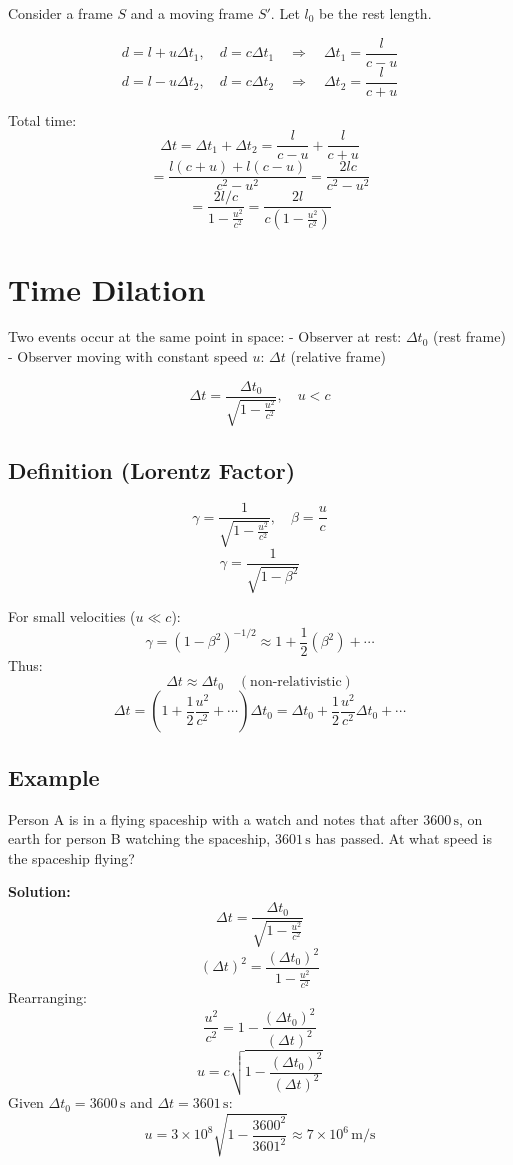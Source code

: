 \documentclass[a4paper,12pt]{article}
\begin{document}
\begin{multicols}{2}
Consider a frame \( S \) and a moving frame \( S' \). Let \( l_0 \) be the rest length.

\[
d = l + u \Delta t_1, \quad d = c \Delta t_1 \quad \Rightarrow \quad \Delta t_1 = \frac{l}{c - u}
\]
\[
d = l - u \Delta t_2, \quad d = c \Delta t_2 \quad \Rightarrow \quad \Delta t_2 = \frac{l}{c + u}
\]

Total time:
\[
\Delta t = \Delta t_1 + \Delta t_2 = \frac{l}{c - u} + \frac{l}{c + u}
\]
\[
= \frac{l (c + u) + l (c - u)}{c^2 - u^2} = \frac{2lc}{c^2 - u^2}
\]
\[
= \frac{2l/c}{1 - \frac{u^2}{c^2}} = \frac{2l}{c(1 - \frac{u^2}{c^2})} \tag{L5}
\]

\section*{Time Dilation}
Two events occur at the same point in space:
- Observer at rest: \( \Delta t_0 \) (rest frame)
- Observer moving with constant speed \( u \): \( \Delta t \) (relative frame)

\[
\Delta t = \frac{\Delta t_0}{\sqrt{1 - \frac{u^2}{c^2}}}, \quad u < c
\]

\subsection*{Definition (Lorentz Factor)}
\[
\gamma = \frac{1}{\sqrt{1 - \frac{u^2}{c^2}}}, \quad \beta = \frac{u}{c}
\]
\[
\gamma = \frac{1}{\sqrt{1 - \beta^2}}
\]

For small velocities (\( u \ll c \)):
\[
\gamma = (1 - \beta^2)^{-1/2} \approx 1 + \frac{1}{2} (\beta^2) + \cdots
\]
Thus:
\[
\Delta t \approx \Delta t_0 \quad (\text{non-relativistic})
\]
\[
\Delta t = \left( 1 + \frac{1}{2} \frac{u^2}{c^2} + \cdots \right) \Delta t_0 = \Delta t_0 + \frac{1}{2} \frac{u^2}{c^2} \Delta t_0 + \cdots
\]

\subsection*{Example}
Person A is in a flying spaceship with a watch and notes that after \( 3600 \, \text{s} \), on earth for person B watching the spaceship, \( 3601 \, \text{s} \) has passed. At what speed is the spaceship flying?

\textbf{Solution:}
\[
\Delta t = \frac{\Delta t_0}{\sqrt{1 - \frac{u^2}{c^2}}}
\]
\[
\left( \Delta t \right)^2 = \frac{\left( \Delta t_0 \right)^2}{1 - \frac{u^2}{c^2}}
\]
Rearranging:
\[
\frac{u^2}{c^2} = 1 - \frac{(\Delta t_0)^2}{(\Delta t)^2}
\]
\[
u = c \sqrt{1 - \frac{(\Delta t_0)^2}{(\Delta t)^2}}
\]
Given \( \Delta t_0 = 3600 \, \text{s} \) and \( \Delta t = 3601 \, \text{s} \):
\[
u = 3 \times 10^8 \sqrt{1 - \frac{3600^2}{3601^2}} \approx 7 \times 10^6 \, \text{m/s}
\]


\end{multicols}
\end{document}
